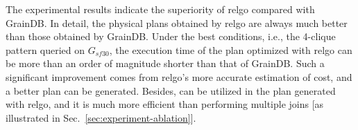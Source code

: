The experimental results indicate the superiority of relgo compared with GrainDB.
In detail, the physical plans obtained by relgo are always much better than those obtained by GrainDB.
Under the best conditions, i.e., the 4-clique pattern queried on $G_{sf30}$, the execution time of the plan optimized with relgo can be more than an order of magnitude shorter than that of GrainDB.
Such a significant improvement comes from relgo's more accurate estimation of cost, and a better plan can be generated.
Besides, \expandintersectrule can be utilized in the plan generated with relgo, and it is much more efficient than performing multiple joins [as illustrated in Sec.~\ref{sec:experiment-ablation}].

